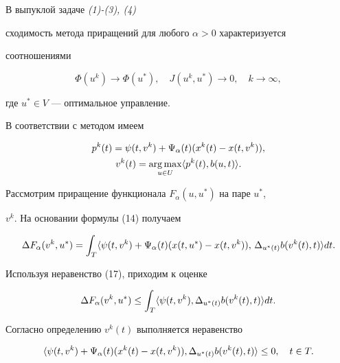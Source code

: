  


\begin{thmnonum} В выпуклой задаче {\em (1)-(3), (4)} 


сходимость метода приращений для любого $\alpha>0$ характеризуется 


соотношениями 


$$ 


\Phi(u^k)\to\Phi(u^*),\quad 


J(u^k,u^*)\to 0,\quad k\to\infty, 


$$ 


где $u^*\in V$ --- оптимальное управление. 


\end{thmnonum} 


 


\begin{pf} В соответствии с методом имеем 


\begin{gather*} 


p^k(t)=\psi(t,v^k)+\Psi_\alpha(t)(x^k(t)-x(t,v^k)),\\ 


v^k(t)=\argmax_{u\in U}\la p^k(t),b(u,t)\ra. 


\end{gather*} 


Рассмотрим приращение функционала $F_\alpha(u,u^*)$ на паре $u^*$, 


$v^k$. На основании формулы (14) получаем 


$$ 


\Delta F_\alpha(v^k,u^*)=\int_T\la\psi(t,v^k)+\Psi_\alpha(t) 


(x(t,u^*)-x(t,v^k)),\,\Delta_{u^*(t)}b(v^k(t),t)\ra dt. 


$$ 


Используя неравенство (17), приходим к оценке 


$$ 


\Delta F_\alpha(v^k,u^*)\le\int_T\la\psi(t,v^k), 


\Delta_{u^*(t)}b(v^k(t),t)\ra dt. 


$$ 


Согласно определению $v^k(t)$ выполняется неравенство 


$$ 


\la\psi(t,v^k)+\Psi_\alpha(t)(x^k(t)-x(t,v^k)), 


\Delta_{u^*(t)}b(v^k(t),t)\ra\le 0,\quad t\in T. 


$$ 



\end{pf}
